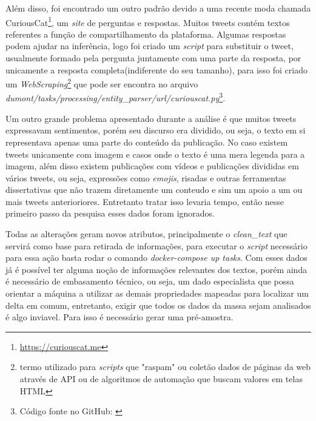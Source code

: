 Além disso, foi encontrado um outro padrão devido a uma recente moda chamada CuriousCat\footnote{\url{https://curiouscat.me}}, um \textit{site} de perguntas e respostas. Muitos tweets contém textos referentes a função de compartilhamento da plataforma. Algumas respostas podem ajudar na inferência, logo foi criado um \textit{script} para substituir o tweet, usualmente formado pela pergunta juntamente com uma parte da resposta, por unicamente a resposta completa(indiferente do seu tamanho), para isso foi criado um \textit{WebScraping}\footnote{termo utilizado para \textit{scripts} que "raspam" ou coletão dados de páginas da web através de API ou de algoritmos de automação que buscam valores em telas HTML} que pode ser encontra no arquivo \textit{dumont/tasks/processing/entity\_parser/url/curiouscat.py}\footnote{Código fonte no GitHub: \url{}}.

Um outro grande problema apresentado durante a análise é que muitos tweets expressavam sentimentos, porém seu discurso era dividido, ou seja, o texto em si representava apenas uma parte do conteúdo da publicação. No caso existem tweets unicamente com imagem e casos onde o texto é uma mera legenda para a imagem, além disso existem publicações com vídeos e publicações divididas em vários tweets, ou seja, expressões como \textit{emojis}, risadas e outras ferramentas dissertativas que não trazem diretamente um conteudo e sim um apoio a um ou mais tweets anterioriores. Entretanto tratar isso levaria tempo, então nesse primeiro passo da pesquisa esses dados foram ignorados.

Todas as alterações geram novos atributos, principalmente o \textit{clean\_text} que servirá como base para retirada de informações, para executar o \textit{script} necessário para essa ação basta rodar o comando \textit{docker-compose up tasks}. Com esses dados já é possível ter alguma noção de informações relevantes dos textos, porém ainda é necessário de embasamento técnico, ou seja, um dado especialista que possa orientar a máquina a utilizar as demais propriedades mapeadas para localizar um delta em comum, entretanto, exigir que todos os dados da massa sejam analisados é algo inviavel. Para isso é necessário gerar uma pré-amostra.